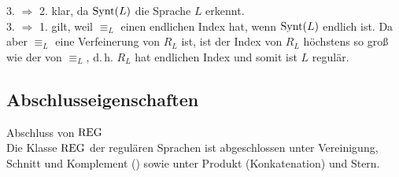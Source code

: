 \begin{Beweis}
    3. $\Rightarrow$ 2. klar, da $\text{Synt}(L)$ die Sprache $L$ erkennt.\\
    3. $\Rightarrow$ 1. gilt, weil
    $\equiv_L$ einen endlichen Index hat, wenn $\text{Synt}(L)$ endlich ist.
    Da aber $\equiv_L$ eine Verfeinerung von $R_L$ ist, ist der Index von
    $R_L$ höchstens so groß wie der von $\equiv_L$, d.\,h.
    $R_L$ hat endlichen Index und somit ist $L$ regulär.
\end{Beweis}

\pagebreak

\subsection{%
    Abschlusseigenschaften%
}

\begin{Satz}{Abschluss von $\text{REG}$}\\
    Die Klasse $\text{REG}$ der regulären Sprachen ist abgeschlossen unter
    Vereinigung, Schnitt und Komplement
    () sowie unter
    Produkt (Konkatenation) und Stern.
\end{Satz}


